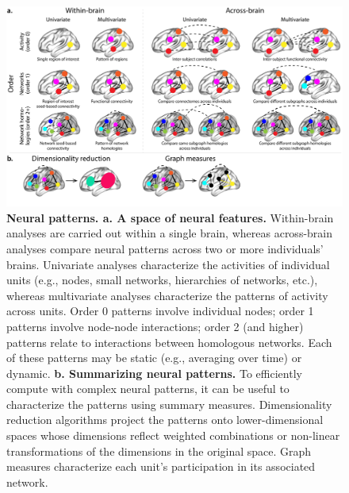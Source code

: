 \documentclass[english]{article}
\begin{document}
\begin{figure}[tp]
  \centering
  \includegraphics[width=\textwidth]{figs/patterns}
  \caption{\textbf{Neural patterns. a. A space of neural features.}
    Within-brain analyses are carried out within a single brain,
    whereas across-brain analyses compare neural patterns across two
    or more individuals' brains.  Univariate analyses characterize the
    activities of individual units (e.g., nodes, small networks,
    hierarchies of networks, etc.), whereas multivariate analyses
    characterize the patterns of activity across units.  Order 0
    patterns involve individual nodes; order 1 patterns involve
    node-node interactions; order 2 (and higher) patterns relate to
    interactions between homologous networks.  Each of these patterns
    may be static (e.g., averaging over time) or dynamic.
  \textbf{b. Summarizing neural patterns.} To efficiently compute
    with complex neural patterns, it can be useful to characterize the
    patterns using summary measures.  Dimensionality reduction
    algorithms project the patterns onto lower-dimensional spaces
    whose dimensions reflect weighted combinations or non-linear
    transformations of the dimensions in the original space.  Graph
    measures characterize each unit's participation in its associated
    network.}
  \label{fig:patterns}
\end{figure}
\end{document}
